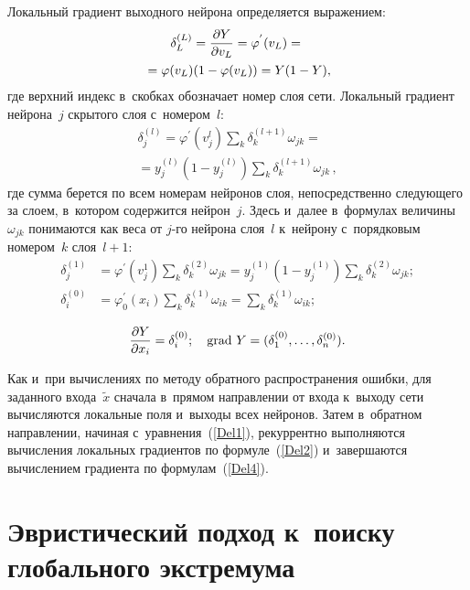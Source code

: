\begin{multicols}{2}
Локальный градиент выходного нейрона определяется выражением:
\begin{multline}
\label{Del1}
\delta_L^{(L)}=\displaystyle\frac{\displaystyle \partial Y\mathstrut}{\displaystyle \partial v_L\mathstrut}=
\varphi^{'}(v_L)={}\\
{}=\varphi(v_L)(1-\varphi(v_L))= Y(1-Y),
\end{multline}
где верхний индекс в~скобках обозначает номер слоя сети.
Локальный градиент  нейрона~$j$ скрытого слоя с~номером~$l$:
\begin{multline}
\label{Del2}
\delta_j^{(l)}=\varphi^\prime
\left(v_j^l\right)\sum\limits_{k} \delta_k^{(l+1)} 
\omega_{jk}={}\\
{}=y_j^{(l)}\left(1-y_j^{(l)}\right)
\sum\limits_{k} \delta_k^{(l+1)} \omega_{jk}\,,
\end{multline}
где сумма берется по всем номерам нейронов слоя, 
непосредственно следующего за слоем, в~котором содержится нейрон~$j$. 
Здесь и~далее в~формулах величины~$\omega_{jk}$ понимаются как веса 
от $j$-го нейрона слоя~$l$ к~нейрону с~порядковым номером~$k$ слоя~$l+1$:
\begin{align*}
\delta_j^{(1)}&=\varphi^\prime\left( 
v_j^1 \right)\sum\limits_{k} \!\delta_k^{(2)} \omega_{jk} = 
y_j^{(1)}\left(1-y_j^{(1)}\right)\sum\limits_{k}\! \delta_k^{(2)} \omega_{jk};
\\
\delta_i^{(0)}&=\varphi_0^\prime ( x_i )\sum\limits_{k} \!
\delta_k^{(1)} \omega_{ik}=\sum\limits_{k} \!\delta_k^{(1)} \omega_{ik};
\end{align*}

\vspace*{-12pt}
\noindent
\begin{equation}
\displaystyle\frac{\displaystyle \partial Y\mathstrut}{\displaystyle \partial x_i\mathstrut}=\delta_i^{(0)}; \quad 
\mathrm{grad} \ Y = (\delta_1^{(0)},\dots, \delta_n^{(0)}).
\label{Del4}
\end{equation}

Как и~при вычислениях по методу обратного распространения ошибки, для 
заданного входа~$\tilde{x}$ сначала в~прямом направлении от входа к~выходу 
сети вычисляются локальные поля и~выходы всех нейронов. Затем в~обратном 
направлении, начиная с~уравнения~(\ref{Del1}), рекуррентно выполняются 
вычисления локальных градиентов по формуле~(\ref{Del2}) и~завершаются 
вычислением градиента по формулам~(\ref{Del4}).



\section{Эвристический подход к~поиску глобального экстремума}


\end{multicols}
